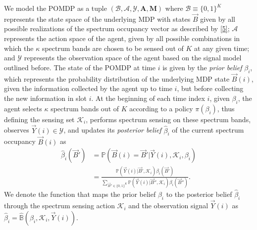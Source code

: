 \documentclass[10pt,twocolumn]{IEEEtran}
\begin{document}
We model the POMDP as a tuple $(\mathcal B,\mathcal{A},\mathcal{Y},\mathbf{A},\mathbf{M})$ where $\mathcal{B}\equiv\{0,1\}^K$ represents the state space of the underlying MDP with states $\vec{B}$ given by all possible realizations of the spectrum occupancy vector as described by \eqref{5}; $\mathcal{A}$ represents the action space of the agent, given by all possible combinations in which the $\kappa$ spectrum bands are chosen to be sensed out of $K$ at any given time; and $\mathcal{Y}$ represents the observation space of the agent based on the signal model outlined before. The state of the POMDP at time $i$ is given by the \emph{prior belief} $\beta_i$, which represents the probability distribution of the underlying MDP state $\vec{B}(i)$, given the information collected by the agent up to time $i$, but before collecting the new information in slot $i$. At the beginning of each time index $i$, given $\beta_i$, the agent selects $\kappa$ spectrum bands out of $K$ according to a policy $\pi(\beta_i)$, thus defining the sensing set $\mathcal K_i$, performs spectrum sensing  on these spectrum bands, observes $\vec{Y}(i){\in} \mathcal{Y}$, and updates its \emph{posterior belief} $\hat{\beta}_i$ of the current spectrum occupancy $\vec{B}(i)$ as 
\begin{align}\label{11}
\hat\beta_i(\vec{B}') &= \mathbb{P}(\vec{B}(i) = \vec{B}'|\vec{Y}(i), \mathcal K_i, \beta_i)\\&=
\nonumber
\frac{\mathbb{P}(\vec{Y}(i)|\vec{B}', \mathcal{K}_i) \beta_i(\vec{B}')}{
\sum_{\vec{B}'' {\in} \{0,1\}^K} \mathbb{P}(\vec{Y}(i)|\vec{B}'', \mathcal{K}_i) \beta_i(\vec{B}'')}.
\end{align}
We denote the function that maps the prior belief $\beta_i$ to the posterior belief $\hat\beta_i$ through the spectrum sensing action $\mathcal K_i$ and the observation signal $\vec{Y}(i)$ as $\hat\beta_i=\hat{\mathbb B}(\beta_i, \mathcal K_i, \vec{Y}(i))$.
\end{document}
